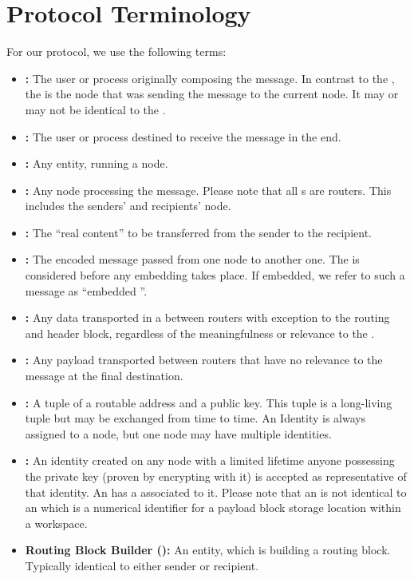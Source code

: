 \section{Protocol Terminology}
For our protocol, we use the following terms:
\begin{itemize}
	\item \textbf{:} The user or process originally composing the message. In contrast to the , the  is the node that was sending the message to the current node. It may or may not be identical to the .
	\item \textbf{:} The user or process destined to receive the message in the end.
	\item \textbf{:} Any entity, running a \MessageVortex{} node.
	\item \textbf{:} Any node processing the message. Please note that all \VortexNode{}s are routers. This includes the senders' and recipients' node.
	\item \textbf{:} The ``real content'' to be transferred from the sender to the recipient.    
	\item \textbf{:} The encoded message passed from one node to another one. The \VortexMessage{} is considered before any embedding takes place. If embedded, we refer to such a message as ``embedded \VortexMessage''.
	\item \textbf{:} Any data transported in a \VortexMessage{} between routers with exception to the routing and header block, regardless of the meaningfulness or relevance to the \VortexMessage.
	\item \textbf{:} Any payload transported between routers that have no relevance to the message at the final destination.
	\item \textbf{:} A tuple of a routable address and a public key. This tuple is a long-living tuple but may be exchanged from time to time. An Identity is always assigned to a node, but one node may have multiple identities. 
	\item \textbf{:} An identity created on any node with a limited lifetime anyone possessing the private key (proven by encrypting with it) is accepted as representative of that identity. An  has a  associated to it. Please note that an  is not identical to an  which is a numerical identifier for a payload block storage location within a workspace.
	\item \textbf{Routing Block Builder ():} An entity, which is building a routing block. Typically identical to either sender or recipient.
\end{itemize}

